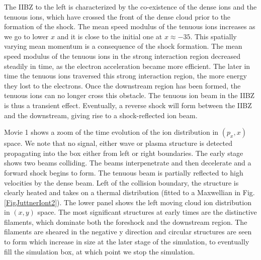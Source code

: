 \documentclass[structabstract]{aa}
\begin{document}
The IIBZ to the left is characterized by the co-existence of the dense ions and the tenuous ions, which have crossed 
the front of the dense cloud prior to the formation of the shock. The mean speed modulus of the tenuous ions increases 
as we go to lower $x$ and it is close to the initial one at $x\approx -35$. This spatially varying mean momentum is a 
consequence of the shock formation. The mean speed modulus of the tenuous ions in the strong interaction region 
decreased steadily in time, as the electron acceleration became more efficient. The later in time the tenuous ions 
traversed this strong interaction region, the more energy they lost to the electrons. Once the downstream region has 
been formed, the tenuous ions can no longer cross this obstacle. The tenuous ion beam in the IIBZ is thus a transient 
effect. Eventually, a reverse shock will form between the IIBZ and the downstream, giving rise to a shock-reflected 
ion beam. 

Movie 1 shows a zoom of the time evolution of the ion distribution in $(p_x,x)$ space.
{
We note that no signal, either wave or plasma structure is detected propagating into the box either from left or right boundaries.}
The early stage shows two beams colliding.
The beams interpenetrate and then decelerate and a forward shock begins to form.
The tenuous beam is partially reflected to high velocities by the dense beam.
Left of the collision boundary, the structure is clearly heated and takes on a thermal distribution (fitted to a Maxwellian in Fig. \ref{FigJuttnerIont2}).
The lower panel shows the left moving cloud ion distribution in $(x,y)$ space.
The most significant structures at early times are the distinctive filaments, which dominate both the foreshock and the downstream region.
The filaments are sheared in the negative y direction and 
circular structures are seen to form which increase in size at the later stage of the simulation, to eventually fill the simulation box, at which point we stop the simulation.
\end{document}
